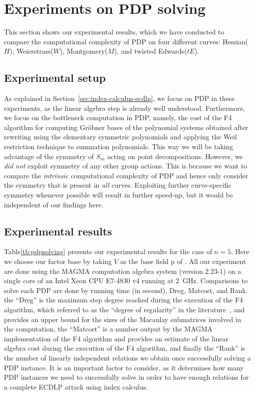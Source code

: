 \section{Experiments on PDP solving}
\label{sec:experiment}

This section shows our experimental results, which we have conducted to
compare the computational complexity of PDP on four different curves:
Hessian($H$), Weierstrass($W$), Montgomery($M$), and twisted
Edwards($tE$).

\subsection{Experimental setup}
\label{subsec:conditions}



As explained in Section~\ref{sec:index-calculus-ecdlp}, we focus on
PDP in these experiments, as the linear algebra step is already well
understood.
%
Furthermore, we focus on the bottleneck computation in PDP, namely,
the cost of the F4 algorithm for computing Gr\"obner bases of the
polynomial systems obtained after rewriting using the elementary
symmetric polynomials and applying the Weil restriction technique to
summation polynomials.
%
This way we will be taking advantage of the symmetry of $S_m$ acting
on point decompositions.
% 
However, we \emph{did not} exploit symmetry of any other group
actions.
%
This is because we want to compare the \emph{intrinsic} computational
complexity of PDP and hence only consider the symmetry that is present
in \emph{all} curves.
%
Exploiting further curve-specific symmetry whenever possible will
result in further speed-up, but it would be independent of our
findings here.


\subsection{Experimental results}
%
\label{sec:experiment-result}

Table\ref{tb:pdpsolving} presents our experimental results for the case of $n=5$.
%
Here we choose our factor base by taking $V$ as the base field \F p of
.
%
All our experiment are done using the MAGMA computation algebra system
(version 2.23-1) on a single core of an Intel Xeon CPU E7-4830 v4
running at 2~GHz.
%
Comparisons to solve each PDP are done by running time (in second),
Dreg, Matcost, and Rank.
%
the ``Dreg'' is the maximum step degree reached during the execution of the F4 algorithm, 
which referred to as the ``degree of regularity''
in the literature~\cite{DBLP:conf/indocrypt/GalbraithG14}, and
provides an upper bound for the sizes of the Macaulay submatrices
involved in the computation, 
%
the ``Matcost'' is a number output by the MAGMA implementation of the
F4 algorithm and provides an estimate of the linear algebra cost
during the execution of the F4 algorithm,
%
and finally the ``Rank'' is the number of linearly independent
relations we obtain once successfully solving a PDP instance.
%
It is an important factor to consider, as it determines how many PDP
instances we need to successfully solve in order to have enough
relations for a complete ECDLP attack using index calculus.


